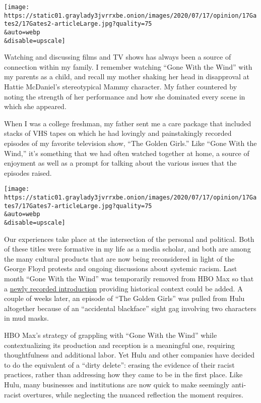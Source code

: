 \texttt{[image: https://static01.graylady3jvrrxbe.onion/images/2020/07/17/opinion/17Gates2/17Gates2-articleLarge.jpg?quality=75\\\&auto=webp\\\&disable=upscale]}

Watching and discussing films and TV shows has always been a source of
connection within my family. I remember watching ``Gone With the Wind''
with my parents as a child, and recall my mother shaking her head in
disapproval at Hattie McDaniel's stereotypical Mammy character. My
father countered by noting the strength of her performance and how she
dominated every scene in which she appeared.

When I was a college freshman, my father sent me a care package that
included stacks of VHS tapes on which he had lovingly and painstakingly
recorded episodes of my favorite television show, ``The Golden Girls.''
Like ``Gone With the Wind,'' it's something that we had often watched
together at home, a source of enjoyment as well as a prompt for talking
about the various issues that the episodes raised.

\texttt{[image: https://static01.graylady3jvrrxbe.onion/images/2020/07/17/opinion/17Gates7/17Gates7-articleLarge.jpg?quality=75\\\&auto=webp\\\&disable=upscale]}

Our experiences take place at the intersection of the personal and
political. Both of these titles were formative in my life as a media
scholar, and both are among the many cultural products that are now
being reconsidered in light of the George Floyd protests and ongoing
discussions about systemic racism. Last month ``Gone With the Wind'' was
temporarily removed from HBO Max so that a
\href{https://www.youtube.com/watch?v=0DF2FKRToiQ\&feature=emb_title}{newly
recorded introduction} providing historical context could be added. A
couple of weeks later, an episode of ``The Golden Girls'' was pulled
from Hulu altogether because of an ``accidental blackface'' sight gag
involving two characters in mud masks.

HBO Max's strategy of grappling with ``Gone With the Wind'' while
contextualizing its production and reception is a meaningful one,
requiring thoughtfulness and additional labor. Yet Hulu and other
companies have decided to do the equivalent of a ``dirty delete'':
erasing the evidence of their racist practices, rather than addressing
how they came to be in the first place. Like Hulu, many businesses and
institutions are now quick to make seemingly anti-racist overtures,
while neglecting the nuanced reflection the moment requires.

